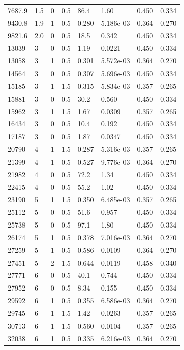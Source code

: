 \documentclass[preview]{standalone}
\begin{document}
{{\begin{tabular}{L{1.2cm}C{1.2cm} C{0.3cm}C{0.5cm} C{1.4cm}C{1.4cm} C{1.4cm}C{1.4cm}}
  7687.9  &   1.5  & 0     & 0.5 &  86.4  & 1.60  & 0.450 &  0.334   \\ 
  9430.8  &   1.9  & 1     & 0.5 &  0.280  & 5.186e-03  & 0.364 &  0.270   \\ 
  9821.6  &   2.0  & 0     & 0.5 &  18.5  & 0.342  & 0.450 &  0.334   \\ 
  13039  &     3  & 0     & 0.5 &  1.19  & 0.0221  & 0.450 &  0.334   \\ 
  13058  &     3  & 1     & 0.5 &  0.301  & 5.572e-03  & 0.364 &  0.270   \\ 
  14564  &     3  & 0     & 0.5 &  0.307  & 5.696e-03  & 0.450 &  0.334   \\ 
  15185  &     3  & 1     & 1.5 &  0.315  & 5.834e-03  & 0.357 &  0.265   \\ 
  15881  &     3  & 0     & 0.5 &  30.2  & 0.560  & 0.450 &  0.334   \\ 
  15962  &     3  & 1     & 1.5 &  1.67  & 0.0309  & 0.357 &  0.265   \\ 
  16434  &     3  & 0     & 0.5 &  10.4  & 0.192  & 0.450 &  0.334   \\ 
  17187  &     3  & 0     & 0.5 &  1.87  & 0.0347  & 0.450 &  0.334   \\ 
  20790  &     4  & 1     & 1.5 &  0.287  & 5.316e-03  & 0.357 &  0.265   \\ 
  21399  &     4  & 1     & 0.5 &  0.527  & 9.776e-03  & 0.364 &  0.270   \\ 
  21982  &     4  & 0     & 0.5 &  72.2  & 1.34  & 0.450 &  0.334   \\ 
  22415  &     4  & 0     & 0.5 &  55.2  & 1.02  & 0.450 &  0.334   \\ 
  23190  &     5  & 1     & 1.5 &  0.350  & 6.485e-03  & 0.357 &  0.265   \\ 
  25112  &     5  & 0     & 0.5 &  51.6  & 0.957  & 0.450 &  0.334   \\ 
  25738  &     5  & 0     & 0.5 &  97.1  & 1.80  & 0.450 &  0.334   \\ 
  26174  &     5  & 1     & 0.5 &  0.378  & 7.016e-03  & 0.364 &  0.270   \\ 
  27259  &     5  & 1     & 0.5 &  0.586  & 0.0109  & 0.364 &  0.270   \\ 
  27451  &     5  & 2     & 1.5 &  0.644  & 0.0119  & 0.458 &  0.340   \\ 
  27771  &     6  & 0     & 0.5 &  40.1  & 0.744  & 0.450 &  0.334   \\ 
  27952  &     6  & 0     & 0.5 &  8.34  & 0.155  & 0.450 &  0.334   \\ 
  29592  &     6  & 1     & 0.5 &  0.355  & 6.586e-03  & 0.364 &  0.270   \\ 
  29745  &     6  & 1     & 1.5 &  1.42  & 0.0263  & 0.357 &  0.265   \\ 
  30713  &     6  & 1     & 1.5 &  0.560  & 0.0104  & 0.357 &  0.265   \\ 
  32038  &     6  & 1     & 0.5 &  0.335  & 6.216e-03  & 0.364 &  0.270   \\ 
\hline 
\end{tabular} 

}}
\end{document}

